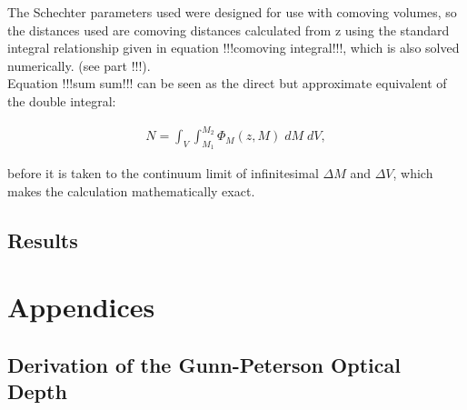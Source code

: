 \documentclass[pdf,color]{UoBnote}
\begin{document}
The Schechter parameters used were designed for use with comoving volumes, so the distances used are comoving distances calculated from z using the standard integral relationship given in equation !!!comoving integral!!!, which is also solved numerically. (see part !!!). \\

Equation !!!sum sum!!! can be seen as the direct but approximate equivalent of the double integral:

\begin{align}
			N = \int_V { \int_{M_1}^{M_2}   { \Phi_M(z,M)  \; dM } \; dV } ,
\end{align}

before it is taken to the continuum limit of infinitesimal $\Delta M$ and $\Delta V$, which makes the calculation mathematically exact.

\subsection{Results}	%

\newpage

\section{Appendices}


\subsection{Derivation of the Gunn-Peterson Optical Depth} \label{appendix:opticaldepth}
\end{document}
